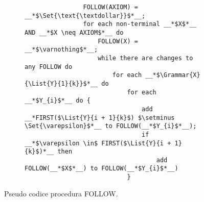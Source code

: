 \documentclass{subfiles}
\begin{document}
\begin{figure}[h!]
    \centering
    \begin{subfigure}[b]{0.6\textwidth}
        \begin{lstlisting}
                FOLLOW(AXIOM) = __*$\Set{\text{\textdollar}}$*__;
                for each non-terminal __*$X$*__ AND __*$X \neq AXIOM$*__ do 
                    FOLLOW(X) = __*$\varnothing$*__;
                    while there are changes to any FOLLOW do 
                        for each __*$\Grammar{X}{\List{Y}{1}{k}}$*__ do 
                            for each __*$Y_{i}$*__ do {
                                add __*FIRST($\List{Y}{i + 1}{k}$) $\setminus \Set{\varepsilon}$*__ to FOLLOW(__*$Y_{i}$*__);
                                if __*$\varepsilon \in$ FIRST($\List{Y}{i + 1}{k}$)*__ then
                                    add FOLLOW(__*$X$*__) to FOLLOW(__*$Y_{i}$*__)
                            }
            \end{lstlisting}
    \end{subfigure}
    \caption{Pseudo codice procedura FOLLOW.}
    \label{fig:4}
\end{figure}
\end{document}

